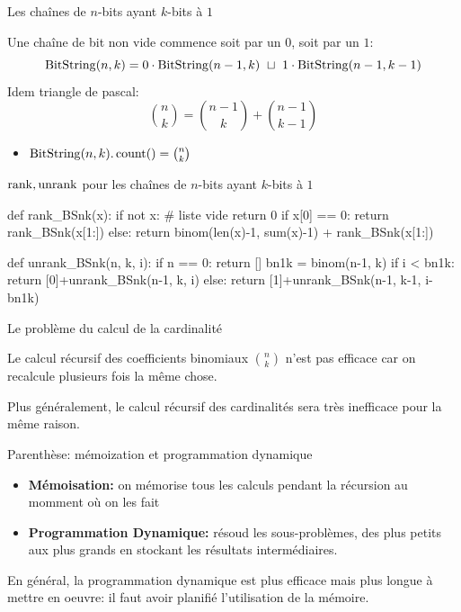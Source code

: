\documentclass{beamer}
\begin{document}
\begin{frame}{Les chaînes de $n$-bits ayant $k$-bits à $1$}

  Une chaîne de bit non vide commence soit par un $0$, soit par un $1$:
  $$\BS(n, k) = 0\cdot\BS(n-1, k)\ \sqcup\ 1\cdot\BS(n-1, k-1)$$
  Idem triangle de pascal:
  $$\binom{n}{k} = \binom{n-1}{k} + \binom{n-1}{k-1}$$
  \begin{itemize}
  \item $\operatorname{BitString}(n, k).\operatorname{count}() = \binom{n}{k}$ 
  \end{itemize}
\end{frame}

\begin{frame}[fragile]{$\operatorname{rank}, \operatorname{unrank}$ pour les chaînes de $n$-bits ayant
    $k$-bits à $1$}

\small
\begin{listing}{1}
def rank_BSnk(x):
    if not x:        # liste vide
        return 0
    if x[0] == 0:
        return rank_BSnk(x[1:])
    else:
        return binom(len(x)-1, sum(x)-1) + rank_BSnk(x[1:])

def unrank_BSnk(n, k, i):
    if n == 0:
        return []
    bn1k = binom(n-1, k)
    if i < bn1k:
        return [0]+unrank_BSnk(n-1, k, i)
    else:
        return [1]+unrank_BSnk(n-1, k-1, i-bn1k)
\end{listing}
\end{frame}


\begin{frame}{Le problème du calcul de la cardinalité}

  \begin{PROBLEM}
    Le calcul récursif des coefficients binomiaux $\binom{n}{k}$ n'est pas
    efficace car on recalcule plusieurs fois la même chose.
    \medskip

    Plus généralement, le calcul récursif des cardinalités sera très
    inefficace pour la même raison.
  \end{PROBLEM}
\end{frame}


\begin{frame}{Parenthèse: mémoization et programmation dynamique}

  \begin{NOTE}
    \begin{itemize}
    \item\textbf{Mémoisation:} on mémorise tous les calculs pendant la
      récursion au momment où on les fait \pause\bigskip

    \item\textbf{Programmation Dynamique:} résoud les sous-problèmes, des plus
      petits aux plus grands en stockant les résultats intermédiaires.
    \end{itemize}
  \end{NOTE}
  \pause\bigskip

  En général, la programmation dynamique est plus efficace mais plus longue à
  mettre en oeuvre: il faut avoir planifié l'utilisation de la mémoire.
\end{frame}
\end{document}
